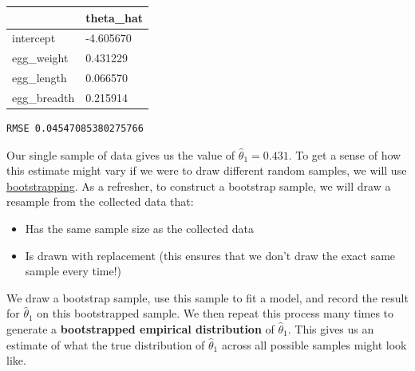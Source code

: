\documentclass[
  letterpaper,
  DIV=11,
  numbers=noendperiod]{scrreprt}
\providecommand{\tightlist}{%
  \setlength{\itemsep}{0pt}\setlength{\parskip}{0pt}}\usepackage{longtable,booktabs,array}
\begin{document}
\begin{longtable}[]{@{}ll@{}}
\toprule\noalign{}
& theta\_hat \\
\midrule\noalign{}
\endhead
\bottomrule\noalign{}
\endlastfoot
intercept & -4.605670 \\
egg\_weight & 0.431229 \\
egg\_length & 0.066570 \\
egg\_breadth & 0.215914 \\
\end{longtable}

\begin{verbatim}
RMSE 0.04547085380275766
\end{verbatim}

Our single sample of data gives us the value of
\(\hat{\theta}_1=0.431\). To get a sense of how this estimate might vary
if we were to draw different random samples, we will use
\href{https://inferentialthinking.com/chapters/13/2/Bootstrap.html?}{bootstrapping}.
As a refresher, to construct a bootstrap sample, we will draw a resample
from the collected data that:

\begin{itemize}
\tightlist
\item
  Has the same sample size as the collected data
\item
  Is drawn with replacement (this ensures that we don't draw the exact
  same sample every time!)
\end{itemize}

We draw a bootstrap sample, use this sample to fit a model, and record
the result for \(\hat{\theta}_1\) on this bootstrapped sample. We then
repeat this process many times to generate a \textbf{bootstrapped
empirical distribution} of \(\hat{\theta}_1\). This gives us an estimate
of what the true distribution of \(\hat{\theta}_1\) across all possible
samples might look like.
\end{document}
